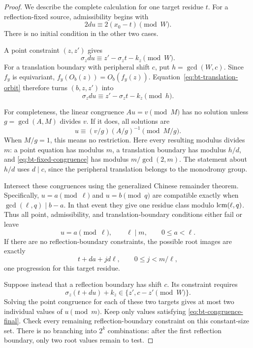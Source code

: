 \begin{proof}
We describe the complete calculation for one target residue $t$.
For a reflection-fixed source, admissibility begins with
\begin{equation}\label{eq:bt-fixed-congruence}
 2du\equiv 2(x_0-t)\pmod W.
\end{equation}
There is no initial condition in the other two cases.

A point constraint $(z,z')$ gives
\begin{equation}\label{eq:bt-point-congruence}
 \sigma_zdu\equiv z'-\sigma_zt-k_z\pmod W.
\end{equation}
For a translation boundary with peripheral shift $c$, put
$h=\gcd(W,c)$.  Since $f_y$ is equivariant,
$f_y(O_b(z))=O_b(f_y(z))$.  Equation~\eqref{eq:bt-translation-orbit}
therefore turns $(b,z,z')$ into
\begin{equation}\label{eq:bt-boundary-congruence}
 \sigma_zdu\equiv z'-\sigma_zt-k_z\pmod h.
\end{equation}

For completeness, the linear congruence $Au=v\pmod M$ has no solution
unless $g=\gcd(A,M)$ divides $v$.  If it does, all solutions are
\[
 u\equiv (v/g)(A/g)^{-1}\pmod{M/g}.
\]
When $M/g=1$, this means no restriction.  Here every resulting modulus
divides $m$: a point equation has modulus $m$, a translation boundary has
modulus $h/d$, and \eqref{eq:bt-fixed-congruence} has modulus
$m/\gcd(2,m)$.  The statement about $h/d$ uses $d\mid c$, since the
peripheral translation belongs to the monodromy group.

Intersect these congruences using the generalized Chinese remainder
theorem.  Specifically, $u=a\pmod\ell$ and $u=b\pmod q$ are compatible
exactly when $\gcd(\ell,q)\mid b-a$.  In that event they give one residue
class modulo $\operatorname{lcm}(\ell,q)$.  Thus all point, admissibility, and
translation-boundary conditions either fail or leave
\begin{equation}\label{eq:bt-congruence-final}
 u=a\pmod\ell,\qquad \ell\mid m,
 \qquad 0\le a<\ell.
\end{equation}
If there are no reflection-boundary constraints, the possible root images
are exactly
\[
 t+da+jd\ell,\qquad 0\le j<m/\ell,
\]
one progression for this target residue.

Suppose instead that a reflection boundary has shift $c$.  Its constraint
requires
\begin{equation}\label{eq:bt-two-targets}
 \sigma_z(t+du)+k_z\in\{z',c-z'\pmod W\}.
\end{equation}
Solving the point congruence for each of these two targets gives at most
two individual values of $u\pmod m$.  Keep only values satisfying
\eqref{eq:bt-congruence-final}.  Check every remaining reflection-boundary
constraint on this constant-size set.  There is no branching into
$2^k$ combinations: after the first reflection boundary, only two root
values remain to test.


\end{proof}
